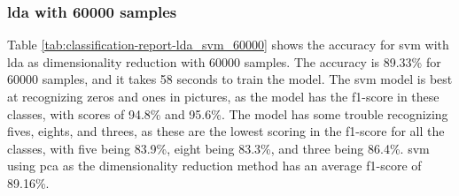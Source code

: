 \subsubsection{\gls{lda} with 60000 samples}\label{subsubsec:experiment-1-results-lda-60000}
Table \ref{tab:classification-report-lda_svm_60000} shows the accuracy for \gls{svm} with \gls{lda} as dimensionality reduction with 60000 samples. The accuracy is 89.33\% for 60000 samples, and it takes 58 seconds to train the model. The \gls{svm} model is best at recognizing zeros and ones in pictures, as the model has the f1-score in these classes, with scores of 94.8\% and 95.6\%. The model has some trouble recognizing fives, eights, and threes, as these are the lowest scoring in the f1-score for all the classes, with five being 83.9\%, eight being 83.3\%, and three being 86.4\%. \gls{svm} using \gls{pca} as the dimensionality reduction method has an average f1-score of 89.16\%.

